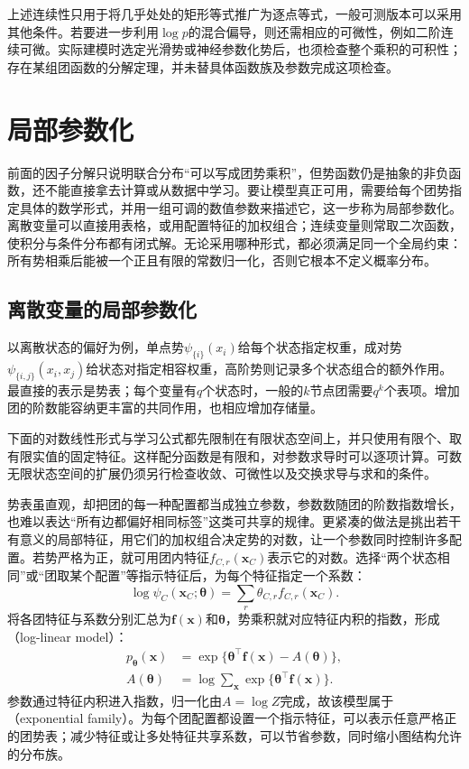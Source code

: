 上述连续性只用于将几乎处处的矩形等式推广为逐点等式，一般可测版本可以采用其他条件。若要进一步利用$\log p$的混合偏导，则还需相应的可微性，例如二阶连续可微。实际建模时选定光滑势或神经参数化势后，也须检查整个乘积的可积性；存在某组团函数的分解定理，并未替具体函数族及参数完成这项检查。

\section{局部参数化}
\label{sec:pgm-undirected-local-parameterization}

前面的因子分解只说明联合分布“可以写成团势乘积”，但势函数仍是抽象的非负函数，还不能直接拿去计算或从数据中学习。要让模型真正可用，需要给每个团势指定具体的数学形式，并用一组可调的数值参数来描述它，这一步称为局部参数化。离散变量可以直接用表格，或用配置特征的加权组合；连续变量则常取二次函数，使积分与条件分布都有闭式解。无论采用哪种形式，都必须满足同一个全局约束：所有势相乘后能被一个正且有限的常数归一化，否则它根本不定义概率分布。

\subsection{离散变量的局部参数化}
\label{sec:pgm-undirected-discrete-parameterization}

以离散状态的偏好为例，单点势$\psi_{\{i\}}(x_i)$给每个状态指定权重，成对势$\psi_{\{i,j\}}(x_i,x_j)$给状态对指定相容权重，高阶势则记录多个状态组合的额外作用。最直接的表示是势表；每个变量有$q$个状态时，一般的$k$节点团需要$q^k$个表项。增加团的阶数能容纳更丰富的共同作用，也相应增加存储量。

下面的对数线性形式与学习公式都先限制在有限状态空间上，并只使用有限个、取有限实值的固定特征。这样配分函数是有限和，对参数求导时可以逐项计算。可数无限状态空间的扩展仍须另行检查收敛、可微性以及交换求导与求和的条件。

势表虽直观，却把团的每一种配置都当成独立参数，参数数随团的阶数指数增长，也难以表达“所有边都偏好相同标签”这类可共享的规律。更紧凑的做法是挑出若干有意义的局部特征，用它们的加权组合决定势的对数，让一个参数同时控制许多配置。若势严格为正，就可用团内特征$f_{C,r}(\bm{x}_C)$表示它的对数。选择“两个状态相同”或“团取某个配置”等指示特征后，为每个特征指定一个系数：
\[
  \log\psi_C(\bm{x}_C;\bm{\theta})
  =\sum_r\theta_{C,r}f_{C,r}(\bm{x}_C).
\]
将各团特征与系数分别汇总为$\bm{f}(\bm{x})$和$\bm{\theta}$，势乘积就对应特征内积的指数，形成（log-linear model）：
\begin{equation}
  \begin{aligned}
    p_{\bm{\theta}}(\bm{x})
      &=\exp\{\bm{\theta}^{\top}\bm{f}(\bm{x})-A(\bm{\theta})\},\\
    A(\bm{\theta})
      &=\log\sum_{\bm{x}}
          \exp\{\bm{\theta}^{\top}\bm{f}(\bm{x})\}.
  \end{aligned}
  \label{eq:pgm-undirected-exponential-family}
\end{equation}
参数通过特征内积进入指数，归一化由$A=\log Z$完成，故该模型属于（exponential family）。为每个团配置都设置一个指示特征，可以表示任意严格正的团势表；减少特征或让多处特征共享系数，可以节省参数，同时缩小图结构允许的分布族。

